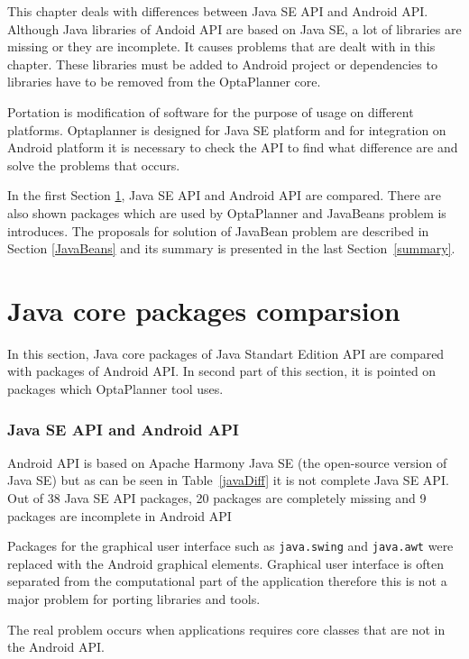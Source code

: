 This chapter deals with differences between Java SE API and Android API. Although Java libraries of Andoid API are based on Java SE, a lot of libraries are missing or they are incomplete. It causes problems that are dealt with in this chapter. These libraries must be added to Android project or dependencies to libraries have to be removed from the OptaPlanner core.

Portation is modification of software for the purpose of usage on different platforms. Optaplanner is designed for Java SE platform and for integration on Android platform it is necessary to check the API to find what difference are and solve the problems that occurs.

In the first Section \ref{comparsion}, Java SE API and Android API are compared. There are also shown packages which are used by OptaPlanner and JavaBeans problem is introduces. The proposals for solution of JavaBean problem are described in Section \ref{JavaBeans} and its summary is presented in the last Section~\ref{summary}.

\section{Java core packages comparsion}\label{comparsion}
In this section, Java core packages of Java Standart Edition API are compared with packages of Android API. In second part of this section, it is pointed on packages which OptaPlanner tool uses.

\subsubsection{Java SE API and Android API}\label{apis}
Android API is based on Apache Harmony Java SE \cite{Apache} (the open-source version of Java SE) but as can be seen in Table~\ref{javaDiff} it is not complete Java SE API. Out of 38 Java SE API packages, 20 packages are completely missing and 9 packages are incomplete in Android API

Packages for the graphical user interface such as \texttt{java.swing} and \texttt{java.awt} were replaced with the Android graphical elements. Graphical user interface is often separated from the computational part of the application therefore this is not a major problem for porting libraries and tools.

The real problem occurs when applications requires core classes that are not in the Android API.

